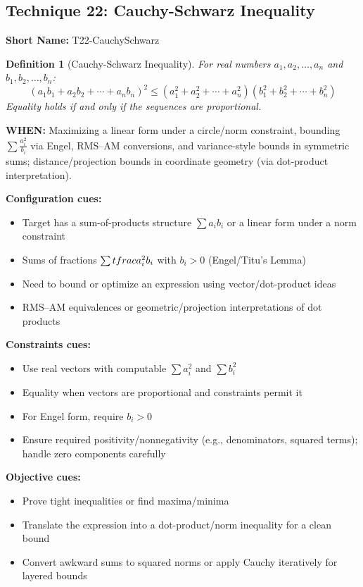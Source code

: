 \documentclass[12pt]{article}
\newtheorem{definition}{Definition}[section]
\begin{document}
\subsection{Technique 22: Cauchy-Schwarz Inequality}
\textbf{Short Name:} T22-CauchySchwarz

\begin{definition}[Cauchy-Schwarz Inequality]
For real numbers $a_1, a_2, \ldots, a_n$ and \\
$b_1, b_2, \ldots, b_n$:
$$(a_1b_1 + a_2b_2 + \cdots + a_nb_n)^2 \leq (a_1^2 + a_2^2 + \cdots + a_n^2)(b_1^2 + b_2^2 + \cdots + b_n^2)$$
Equality holds if and only if the sequences are proportional.
\end{definition}

\textbf{WHEN:} Maximizing a linear form under a circle/norm constraint, bounding \(\sum \tfrac{a_i^2}{b_i}\) via Engel, RMS–AM conversions, and variance-style bounds in symmetric sums; distance/projection bounds in coordinate geometry (via dot-product interpretation).

\textbf{Configuration cues:}
\begin{itemize}
    \item Target has a sum-of-products structure \(\sum a_i b_i\) or a linear form under a norm constraint
    \item Sums of fractions \(\sum \\tfrac{a_i^2}{b_i}\) with \(b_i>0\) (Engel/Titu's Lemma)
    \item Need to bound or optimize an expression using vector/dot-product ideas
    \item RMS–AM equivalences or geometric/projection interpretations of dot products
\end{itemize}

\textbf{Constraints cues:}
\begin{itemize}
    \item Use real vectors with computable \(\sum a_i^2\) and \(\sum b_i^2\)
    \item Equality when vectors are proportional and constraints permit it
    \item For Engel form, require \(b_i>0\)
    \item Ensure required positivity/nonnegativity (e.g., denominators, squared terms); handle zero components carefully
\end{itemize}

\textbf{Objective cues:}
\begin{itemize}
    \item Prove tight inequalities or find maxima/minima
    \item Translate the expression into a dot-product/norm inequality for a clean bound
    \item Convert awkward sums to squared norms or apply Cauchy iteratively for layered bounds
\end{itemize}
\end{document}
